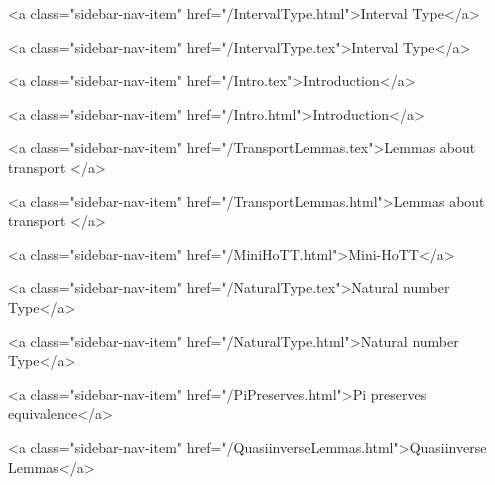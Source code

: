       
        
          <a class="sidebar-nav-item" href="/IntervalType.html">Interval Type</a>
        
      
    
      
        
          <a class="sidebar-nav-item" href="/IntervalType.tex">Interval Type</a>
        
      
    
      
        
          <a class="sidebar-nav-item" href="/Intro.tex">Introduction</a>
        
      
    
      
        
          <a class="sidebar-nav-item" href="/Intro.html">Introduction</a>
        
      
    
      
        
          <a class="sidebar-nav-item" href="/TransportLemmas.tex">Lemmas about transport </a>
        
      
    
      
        
          <a class="sidebar-nav-item" href="/TransportLemmas.html">Lemmas about transport </a>
        
      
    
      
        
          <a class="sidebar-nav-item" href="/MiniHoTT.html">Mini-HoTT</a>
        
      
    
      
        
          <a class="sidebar-nav-item" href="/NaturalType.tex">Natural number Type</a>
        
      
    
      
        
          <a class="sidebar-nav-item" href="/NaturalType.html">Natural number Type</a>
        
      
    
      
        
          <a class="sidebar-nav-item" href="/PiPreserves.html">Pi preserves equivalence</a>
        
      
    
      
        
          <a class="sidebar-nav-item" href="/QuasiinverseLemmas.html">Quasiinverse Lemmas</a>
        
